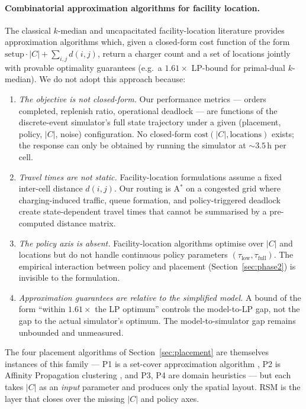\documentclass[conference]{IEEEtran}
\begin{document}
\paragraph{Combinatorial approximation algorithms for facility location.}
The classical $k$-median and uncapacitated facility-location literature \cite{jain2001,vazirani2001} provides approximation algorithms which, given a closed-form cost function of the form $\text{setup}\cdot|C| + \sum_{i,j} d(i,j)$, return a charger count and a set of locations jointly with provable optimality guarantees (e.g.\ a $1.61\times$ LP-bound for primal-dual $k$-median). We do not adopt this approach because:
\begin{enumerate}
  \item \emph{The objective is not closed-form.} Our performance metrics --- orders completed, replenish ratio, operational deadlock --- are functions of the discrete-event simulator's full state trajectory under a given (placement, policy, $|C|$, noise) configuration. No closed-form $\text{cost}(|C|, \text{locations})$ exists; the response can only be obtained by running the simulator at $\sim 3.5$\,h per cell.
  \item \emph{Travel times are not static.} Facility-location formulations assume a fixed inter-cell distance $d(i,j)$. Our routing is A$^\ast$ on a congested grid where charging-induced traffic, queue formation, and policy-triggered deadlock create state-dependent travel times that cannot be summarised by a pre-computed distance matrix.
  \item \emph{The policy axis is absent.} Facility-location algorithms optimise over $|C|$ and locations but do not handle continuous policy parameters $(\tau_\text{low}, \tau_\text{full})$. The empirical interaction between policy and placement (Section~\ref{sec:phase2}) is invisible to the formulation.
  \item \emph{Approximation guarantees are relative to the simplified model.} A bound of the form ``within $1.61\times$ the LP optimum'' \cite{jain2001} controls the model-to-LP gap, not the gap to the actual simulator's optimum. The model-to-simulator gap remains unbounded and unmeasured.
\end{enumerate}
The four placement algorithms of Section~\ref{sec:placement} are themselves instances of this family --- P1 is a set-cover approximation algorithm \cite{kundu2023}, P2 is Affinity Propagation clustering \cite{baras2023}, and P3, P4 are domain heuristics --- but each takes $|C|$ as an \emph{input} parameter and produces only the spatial layout. RSM is the layer that closes over the missing $|C|$ and policy axes.
\end{document}
